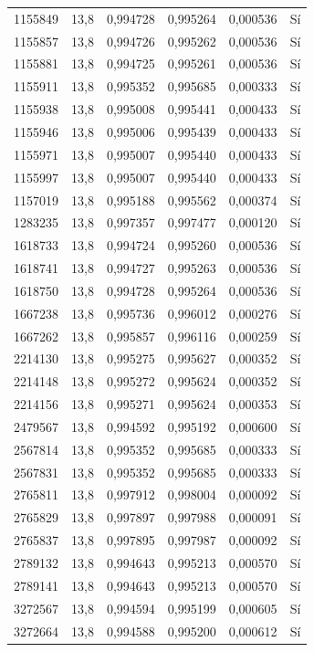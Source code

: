 \begin{longtable}{lccccc}
1155849 & 13,8 & 0,994728 & 0,995264 & 0,000536 & Sí \\
1155857 & 13,8 & 0,994726 & 0,995262 & 0,000536 & Sí \\
1155881 & 13,8 & 0,994725 & 0,995261 & 0,000536 & Sí \\
1155911 & 13,8 & 0,995352 & 0,995685 & 0,000333 & Sí \\
1155938 & 13,8 & 0,995008 & 0,995441 & 0,000433 & Sí \\
1155946 & 13,8 & 0,995006 & 0,995439 & 0,000433 & Sí \\
1155971 & 13,8 & 0,995007 & 0,995440 & 0,000433 & Sí \\
1155997 & 13,8 & 0,995007 & 0,995440 & 0,000433 & Sí \\
1157019 & 13,8 & 0,995188 & 0,995562 & 0,000374 & Sí \\
1283235 & 13,8 & 0,997357 & 0,997477 & 0,000120 & Sí \\
1618733 & 13,8 & 0,994724 & 0,995260 & 0,000536 & Sí \\
1618741 & 13,8 & 0,994727 & 0,995263 & 0,000536 & Sí \\
1618750 & 13,8 & 0,994728 & 0,995264 & 0,000536 & Sí \\
1667238 & 13,8 & 0,995736 & 0,996012 & 0,000276 & Sí \\
1667262 & 13,8 & 0,995857 & 0,996116 & 0,000259 & Sí \\
2214130 & 13,8 & 0,995275 & 0,995627 & 0,000352 & Sí \\
2214148 & 13,8 & 0,995272 & 0,995624 & 0,000352 & Sí \\
2214156 & 13,8 & 0,995271 & 0,995624 & 0,000353 & Sí \\
2479567 & 13,8 & 0,994592 & 0,995192 & 0,000600 & Sí \\
2567814 & 13,8 & 0,995352 & 0,995685 & 0,000333 & Sí \\
2567831 & 13,8 & 0,995352 & 0,995685 & 0,000333 & Sí \\
2765811 & 13,8 & 0,997912 & 0,998004 & 0,000092 & Sí \\
2765829 & 13,8 & 0,997897 & 0,997988 & 0,000091 & Sí \\
2765837 & 13,8 & 0,997895 & 0,997987 & 0,000092 & Sí \\
2789132 & 13,8 & 0,994643 & 0,995213 & 0,000570 & Sí \\
2789141 & 13,8 & 0,994643 & 0,995213 & 0,000570 & Sí \\
3272567 & 13,8 & 0,994594 & 0,995199 & 0,000605 & Sí \\
3272664 & 13,8 & 0,994588 & 0,995200 & 0,000612 & Sí \\

\end{longtable}
